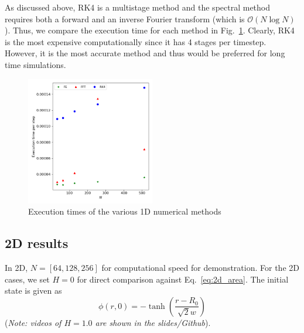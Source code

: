 \documentclass[12pt]{article}
\newcommand{\refeq}[1]{Eq.~\eqref{#1}}
\begin{document}
As discussed above, RK4 is a multistage method and the spectral method requires both a forward and an inverse Fourier transform (which is $\mathcal{O}(N \log N)$).
Thus, we compare the execution time for each method in Fig.~\ref{fig:1d_exec_time}.
Clearly, RK4 is the most expensive computationally since it has 4 stages per timestep.
However, it is the most accurate method and thus would be preferred for long time simulations.

\begin{figure}
    \centering
    \includegraphics[width=0.5\textwidth]{../figures/AC1D_exec_time.png}
    \caption{Execution times of the various 1D numerical methods}
    \label{fig:1d_exec_time}
\end{figure}

\subsection{2D results}
In 2D, $N = [64, 128, 256]$ for computational speed for demonstration.
For the 2D cases, we set $H=0$ for direct comparison against \refeq{eq:2d_area}.
The initial state is given as 
\begin{equation}
    \phi(r,0) = -\tanh \left(\frac{r-R_0}{\sqrt{2} w}\right) \label{eq:2d_init}
\end{equation}
(\textit{Note: videos of $H=1.0$ are shown in the slides/Github}).
\end{document}
